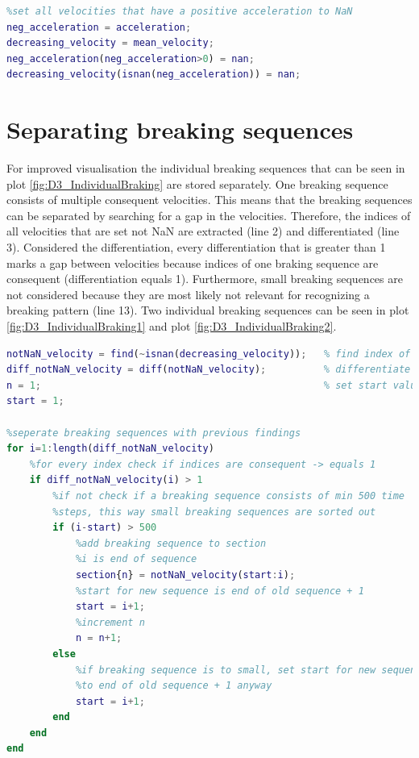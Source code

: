 \begin{lstlisting}[language=Matlab,basicstyle=\scriptsize	,caption= Extracting negative acceleration,label= lst:D3Extract]
%search for negative acceleration and set positive acceleration to NaN
%set all velocities that have a positive acceleration to NaN
neg_acceleration = acceleration;
decreasing_velocity = mean_velocity;
neg_acceleration(neg_acceleration>0) = nan;
decreasing_velocity(isnan(neg_acceleration)) = nan;
\end{lstlisting}


\section{Separating breaking sequences}
For improved visualisation the individual breaking sequences that can be seen in plot \ref{fig:D3_IndividualBraking} are stored separately.
One breaking sequence consists of multiple consequent velocities.
This means that the breaking sequences can be separated by searching for a gap in the velocities.
Therefore, the indices of all velocities that are set not \ac{NaN} are extracted (line 2) and differentiated (line 3).
Considered the differentiation, every differentiation that is greater than 1 marks a gap between velocities because indices of one braking sequence are consequent (differentiation equals 1).
Furthermore, small breaking sequences are not considered because they are most likely not relevant for recognizing a breaking pattern (line 13).
Two individual breaking sequences can be seen in plot \ref{fig:D3_IndividualBraking1} and plot \ref{fig:D3_IndividualBraking2}.

\begin{lstlisting}[language=Matlab,basicstyle=\scriptsize	,caption= Separating breaking sequences,label= lst:D3Seperat]
%find individual breaking sequences
notNaN_velocity = find(~isnan(decreasing_velocity));   % find index of every velocity that is not NaN -> one breaking sequence has consequent time steps -> one breaking sequence has consequent indices
diff_notNaN_velocity = diff(notNaN_velocity);          % differentiate indices -> if indices are not consequent (unequal 1), a new breaking sequence has begun
n = 1;                                                 % set start values
start = 1;

%seperate breaking sequences with previous findings
for i=1:length(diff_notNaN_velocity)
    %for every index check if indices are consequent -> equals 1
    if diff_notNaN_velocity(i) > 1
        %if not check if a breaking sequence consists of min 500 time
        %steps, this way small breaking sequences are sorted out
        if (i-start) > 500
            %add breaking sequence to section
            %i is end of sequence
            section{n} = notNaN_velocity(start:i);
            %start for new sequence is end of old sequence + 1
            start = i+1;
            %increment n
            n = n+1;
        else
            %if breaking sequence is to small, set start for new sequence
            %to end of old sequence + 1 anyway
            start = i+1;
        end
    end
end
\end{lstlisting}

